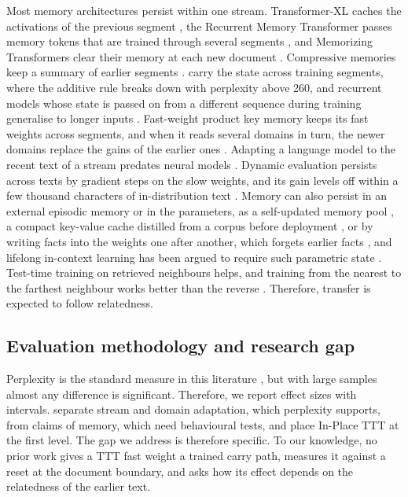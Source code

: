 \documentclass[10pt]{article} %
\begin{document}
Most memory architectures persist within one stream. Transformer-XL caches the activations of the previous segment \citep{dai2019transformerxl}, the Recurrent Memory Transformer passes memory tokens that are trained through several segments \citep{bulatov2022rmt}, and Memorizing Transformers clear their memory at each new document \citep{wu2022memorizing}. Compressive memories keep a summary of earlier segments \citep{rae2019compressive,munkhdalai2024leave}. \citet{schlag2021linear} carry the state across training segments, where the additive rule breaks down with perplexity above 260, and recurrent models whose state is passed on from a different sequence during training generalise to longer inputs \citep{buitrago2025understanding}. Fast-weight product key memory keeps its fast weights across segments, and when it reads several domains in turn, the newer domains replace the gains of the earlier ones \citep{zhao2026fwpkm}. Adapting a language model to the recent text of a stream predates neural models \citep{kneser1993dynamic}. Dynamic evaluation persists across texts by gradient steps on the slow weights, and its gain levels off within a few thousand characters of in-distribution text \citep{krause2018dynamic}. Memory can also persist in an external episodic memory \citep{das2024larimar} or in the parameters, as a self-updated memory pool \citep{wang2024memoryllm}, a compact key-value cache distilled from a corpus before deployment \citep{eyuboglu2025cartridges}, or by writing facts into the weights one after another, which forgets earlier facts \citep{oneill2026continually}, and lifelong in-context learning has been argued to require such parametric state \citep{mcdermott2026lifelong}. Test-time training on retrieved neighbours helps, and training from the nearest to the farthest neighbour works better than the reverse \citep{hardt2024test}. Therefore, transfer is expected to follow relatedness.

\subsection{Evaluation methodology and research gap}

Perplexity is the standard measure in this literature \citep{meister2021beyond}, but with large samples almost any difference is significant. Therefore, we report effect sizes with intervals. \citet{song2026beyond} separate stream and domain adaptation, which perplexity supports, from claims of memory, which need behavioural tests, and place In-Place TTT at the first level. The gap we address is therefore specific. To our knowledge, no prior work gives a TTT fast weight a trained carry path, measures it against a reset at the document boundary, and asks how its effect depends on the relatedness of the earlier text.
\end{document}
